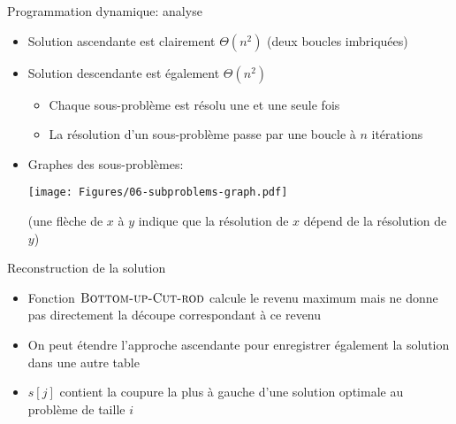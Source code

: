 \begin{frame}{Programmation dynamique: analyse}

\begin{itemize}
\item Solution ascendante est clairement $\Theta(n^2)$ (deux boucles imbriquées)
\item Solution descendante est également $\Theta(n^2)$
\begin{itemize}
\item Chaque sous-problème est résolu une et une seule fois
\item La résolution d'un sous-problème passe par une boucle à $n$ itérations
\end{itemize}
\item Graphes des sous-problèmes:

\centerline{\texttt{[image: Figures/06-subproblems-graph.pdf]}}

(une flèche de $x$ à $y$ indique que la résolution de $x$ dépend de la résolution de $y$)
\end{itemize}


\end{frame}

\begin{frame}{Reconstruction de la solution}
\begin{itemize}
\item Fonction $\textnormal{\scshape Bottom-up-Cut-rod}$ calcule le revenu maximum mais ne donne pas directement la découpe correspondant à ce revenu
\item On peut étendre l'approche ascendante pour enregistrer également la solution dans une autre table
\end{itemize}

\begin{center}
{\footnotesize
{}
}
\end{center}

\begin{itemize}
\item $s[j]$ contient la coupure la plus à gauche d'une solution optimale au problème de taille $i$
\end{itemize}

\end{frame}

